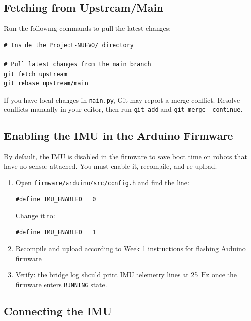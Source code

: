 \documentclass[12pt,letterpaper]{article}
\begin{document}
\subsection{Fetching from Upstream/Main}
\label{sec:fetch}

Run the following commands to pull the
latest changes:

\begin{lstlisting}[style=bash, caption={Fetching and building the sensor fusion branch}]
# Inside the Project-NUEVO/ directory

# Pull latest changes from the main branch
git fetch upstream
git rebase upstream/main

\end{lstlisting}

\begin{notebox}
  If you have local changes in \texttt{main.py}, Git may report a merge
  conflict. Resolve conflicts manually in your editor, then run
  \texttt{git add} and \texttt{git merge --continue}.
\end{notebox}

\subsection{Enabling the IMU in the Arduino Firmware}

By default, the IMU is disabled in the firmware to save boot time on robots
that have no sensor attached.
You must enable it, recompile, and re-upload.

\begin{enumerate}
  \item Open \texttt{firmware/arduino/src/config.h} and find the line:
\begin{lstlisting}[style=cpp]
#define IMU_ENABLED   0
\end{lstlisting}
        Change it to:
\begin{lstlisting}[style=cpp]
#define IMU_ENABLED   1
\end{lstlisting}

  \item Recompile and upload according to Week 1 instructions for flashing Arduino firmware

  \item Verify: the bridge log should print IMU telemetry lines at 25~Hz
        once the firmware enters \texttt{RUNNING} state.
\end{enumerate}

\subsection{Connecting the IMU}
\end{document}
